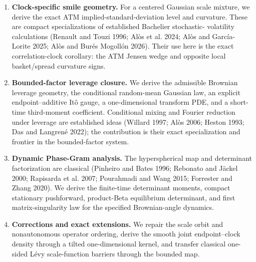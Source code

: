 \documentclass[
  english,
  11pt,
  letterpaper,
  DIV=11,
  numbers=noendperiod]{scrartcl}
\providecommand{\tightlist}{%
  \setlength{\itemsep}{0pt}\setlength{\parskip}{0pt}}
\theoremstyle{plain}
\theoremstyle{plain}
\theoremstyle{plain}
\theoremstyle{plain}
\theoremstyle{remark}
\begin{document}
\begin{enumerate}
\def\labelenumi{\arabic{enumi}.}
\tightlist
\item
  \textbf{Clock-specific smile geometry.} For a centered Gaussian scale
  mixture, we derive the exact ATM implied-standard-deviation level and
  curvature. These are compact specializations of established Bachelier
  stochastic- volatility calculations (Renault and Touzi 1996; Alòs et
  al. 2024; Alòs and García-Lorite 2025; Alòs and Burés Mogollón 2026).
  Their use here is the exact correlation-clock corollary: the ATM
  Jensen wedge and opposite local basket/spread curvature signs.
\item
  \textbf{Bounded-factor leverage closure.} We derive the admissible
  Brownian leverage geometry, the conditional random-mean Gaussian law,
  an explicit endpoint--additive Itô gauge, a one-dimensional transform
  PDE, and a short-time third-moment coefficient. Conditional mixing and
  Fourier reduction under leverage are established ideas (Willard 1997;
  Alòs 2006; Heston 1993; Das and Langrené 2022); the contribution is
  their exact specialization and frontier in the bounded-factor system.
\item
  \textbf{Dynamic Phase-Gram analysis.} The hyperspherical map and
  determinant factorization are classical (Pinheiro and Bates 1996;
  Rebonato and Jäckel 2000; Rapisarda et al. 2007; Pourahmadi and Wang
  2015; Forrester and Zhang 2020). We derive the finite-time determinant
  moments, compact stationary pushforward, product-Beta equilibrium
  determinant, and first matrix-singularity law for the specified
  Brownian-angle dynamics.
\item
  \textbf{Corrections and exact extensions.} We repair the scale orbit
  and nonautonomous operator ordering, derive the smooth joint
  endpoint--clock density through a tilted one-dimensional kernel, and
  transfer classical one-sided Lévy scale-function barriers through the
  bounded map.
\end{enumerate}
\end{document}
